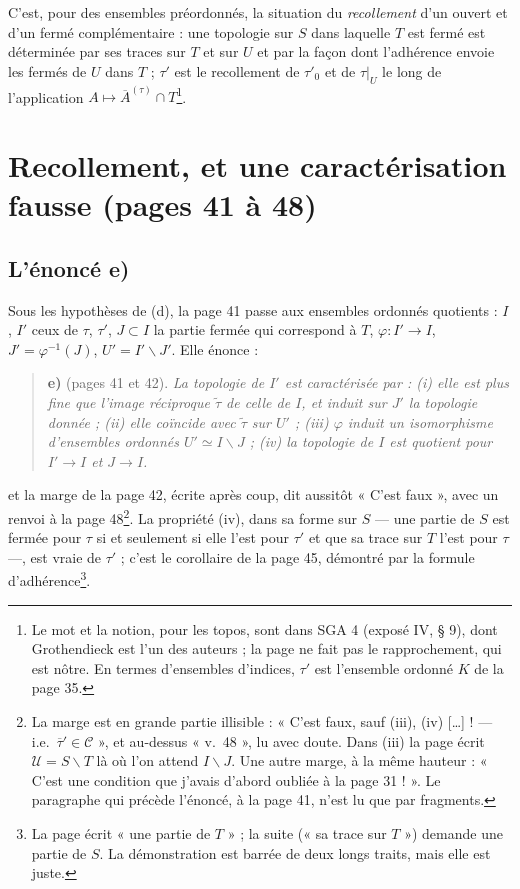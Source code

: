 \documentclass[11pt,a4paper]{article}
\begin{document}
C'est, pour des ensembles préordonnés, la situation du \emph{recollement} d'un
ouvert et d'un fermé complémentaire : une topologie sur $S$ dans laquelle $T$
est fermé est déterminée par ses traces sur $T$ et sur $U$ et par la façon dont
l'adhérence envoie les fermés de $U$ dans $T$ ; $\tau'$ est le recollement de
$\tau'_{0}$ et de $\tau|_{U}$ le long de l'application $A \mapsto
\overline{A}^{(\tau)} \cap T$\footnote{Le mot et la notion, pour les topos,
sont dans SGA 4 (exposé IV, § 9), dont Grothendieck est l'un des auteurs ; la
page ne fait pas le rapprochement, qui est nôtre. En termes d'ensembles
d'indices, $\tau'$ est l'ensemble ordonné $K$ de la page 35.}.

\section*{Recollement, et une caractérisation fausse (pages 41 à 48)}

\subsection*{L'énoncé e)}

Sous les hypothèses de (d), la page 41 passe aux ensembles ordonnés quotients :
$I$, $I'$ ceux de $\tau$, $\tau'$, $J \subset I$ la partie fermée qui correspond
à $T$, $\varphi : I' \to I$, $J' = \varphi^{-1}(J)$, $U' = I' \smallsetminus J'$.
Elle énonce :

\begin{quote}
\textbf{e)} (pages 41 et 42). \emph{La topologie de $I'$ est caractérisée par :
(i) elle est plus fine que l'image réciproque $\widetilde{\tau}$ de celle de
$I$, et induit sur $J'$ la topologie donnée ; (ii) elle coïncide avec
$\widetilde{\tau}$ sur $U'$ ; (iii) $\varphi$ induit un isomorphisme d'ensembles
ordonnés $U' \simeq I \smallsetminus J$ ; (iv) la topologie de $I$ est quotient
pour $I' \to I$ et $J \to I$.}
\end{quote}

\noindent et la marge de la page 42, écrite après coup, dit aussitôt « C'est
faux », avec un renvoi à la page 48\footnote{La marge est en grande partie
illisible : « C'est faux, sauf (iii), (iv) [\ldots] ! --- i.e.\
$\overline{\tau}' \in \mathcal{C}$ », et au-dessus « v.~48 », lu avec doute.
Dans (iii) la page écrit $\mathcal{U} = S \smallsetminus T$ là où l'on attend
$I \smallsetminus J$. Une autre marge, à la même hauteur : « C'est une condition
que j'avais d'abord oubliée à la page 31 ! ». Le paragraphe qui précède
l'énoncé, à la page 41, n'est lu que par fragments.}. La propriété (iv), dans
sa forme sur $S$ --- une partie de $S$ est fermée pour $\tau$ si et seulement
si elle l'est pour $\tau'$ et que sa trace sur $T$ l'est pour $\tau$ ---, est
vraie de $\tau'$ ; c'est le corollaire de la page 45, démontré par la formule
d'adhérence\footnote{La page écrit « une partie de $T$ » ; la suite (« sa trace
sur $T$ ») demande une partie de $S$. La démonstration est barrée de deux longs
traits, mais elle est juste.}.
\end{document}
